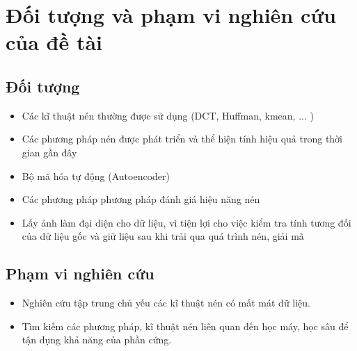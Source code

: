 \section{Đối tượng và phạm vi nghiên cứu của đề tài}
\subsection{Đối tượng}
\begin{itemize}
      \item Các kĩ thuật nén thường được sử dụng (DCT, Huffman, kmean, ... )
      \item Các phương pháp nén được phát triển và thể hiện tính hiệu quả trong thời gian gần đây
      \item Bộ mã hóa tự động (Autoencoder)
      \item Các phương pháp phương pháp đánh giá hiệu năng nén
      \item Lấy ảnh làm đại diện cho dữ liệu, vì tiện lợi cho việc kiểm tra tính
            tương đối của dữ liệu gốc và giữ liệu sau khi trải qua quá trình nén, giải mã
\end{itemize}
\subsection{Phạm vi nghiên cứu}
\begin{itemize}
      \item Nghiên cứu tập trung chủ yếu các kĩ thuật nén có mất mát dữ liệu.
      \item Tìm kiếm các phương pháp, kĩ thuật nén liên quan đến học máy, học sâu để
            tận dụng khả năng của phần cứng.
\end{itemize}



